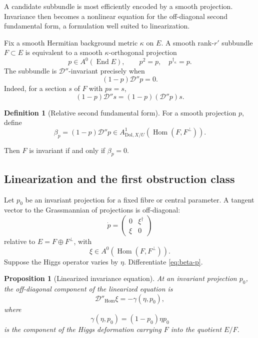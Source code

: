 \documentclass[11pt,reqno]{amsart}
\newtheorem{proposition}[theorem]{Proposition}
\theoremstyle{definition}
\newtheorem{definition}[theorem]{Definition}
\theoremstyle{remark}
\newcommand{\cD}{\mathcal D}
\newcommand{\End}{\operatorname{End}}
\newcommand{\Hom}{\operatorname{Hom}}
\newcommand{\Dol}{\mathrm{Dol}}
\begin{document}
A candidate subbundle is most efficiently encoded by a smooth projection.  Invariance then becomes a nonlinear equation for the off-diagonal second fundamental form, a formulation well suited to linearization.


Fix a smooth Hermitian background metric $\kappa$ on $E$.  A smooth rank-$r'$ subbundle $F\subset E$ is equivalent to a smooth $\kappa$-orthogonal projection
\[
  p\in A^0(\End E),
  \qquad
  p^2=p,
  \quad p^{\dagger_\kappa}=p.
\]
The subbundle is $\cD''$-invariant precisely when
\begin{equation}\label{eq:invariant-projection}
  (1-p)\cD''p=0.
\end{equation}
Indeed, for a section $s$ of $F$ with $ps=s$,
\[
  (1-p)\cD''s=(1-p)(\cD''p)s.
\]

\begin{definition}[Relative second fundamental form]\label{def:relative-second-fundamental}
For a smooth projection $p$, define
\begin{equation}\label{eq:beta-p}
  \beta_p=(1-p)\cD''p
  \in A^1_{\Dol,X/U}(\Hom(F,F^\perp)).
\end{equation}
\end{definition}
Then $F$ is invariant if and only if $\beta_p=0$.

\subsection{Linearization and the first obstruction class}

Let $p_0$ be an invariant projection for a fixed fibre or central parameter.  A tangent vector to the Grassmannian of projections is off-diagonal:
\[
  \dot p=
  \begin{pmatrix}
    0 & \xi^{\dagger}\\
    \xi & 0
  \end{pmatrix}
\]
relative to $E=F\oplus F^\perp$, with
\[
  \xi\in A^0(\Hom(F,F^\perp)).
\]
Suppose the Higgs operator varies by $\eta$.  Differentiate \eqref{eq:beta-p}.

\begin{proposition}[Linearized invariance equation]\label{prop:linearized-invariance}
At an invariant projection $p_0$, the off-diagonal component of the linearized equation is
\begin{equation}\label{eq:linearized-invariance}
  \cD''_{\Hom}\xi
  =-\gamma(\eta,p_0),
\end{equation}
where
\begin{equation}\label{eq:gamma-source}
  \gamma(\eta,p_0)
  =(1-p_0)\eta p_0
\end{equation}
is the component of the Higgs deformation carrying $F$ into the quotient $E/F$.
\end{proposition}
\end{document}
